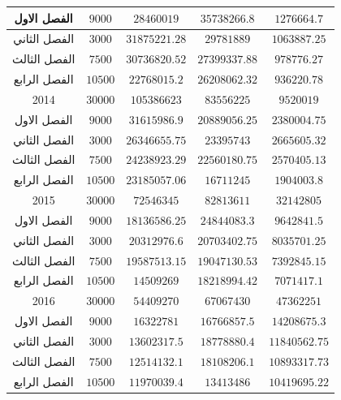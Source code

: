 \documentclass[10pt,a4paper]{report}
\begin{document}
\begin{longtable}{|c|c|c|c|c|}
	الفصل الاول  & $9000$               & $28460019$       & $35738266.8$   & $1276664.7$        \\ \hline
	الفصل الثاني & $3000$               & $31875221.28$    & $29781889$     & $1063887.25$       \\ \hline
	الفصل الثالث & $7500$               & $30736820.52$    & $27399337.88$  & $978776.27$        \\ \hline
	الفصل الرابع & $10500$              & $22768015.2$     & $26208062.32$  & $936220.78$        \\ \hline
	2014         & $30000$              & $105386623$      & $83556225$     & $9520019$          \\ \hline
	الفصل الاول  & $9000$               & $31615986.9$     & $20889056.25$  & $2380004.75$       \\ \hline
	الفصل الثاني & $3000$               & $26346655.75$    & $23395743$     & $2665605.32$       \\ \hline
	الفصل الثالث & $7500$               & $24238923.29$    & $22560180.75$  & $2570405.13$       \\ \hline
	الفصل الرابع & $10500$              & $23185057.06$    & $16711245$     & $1904003.8$        \\ \hline
	2015         & $30000$              & $72546345$       & $82813611$     & $32142805$         \\ \hline
	الفصل الاول  & $9000$               & $18136586.25$    & $24844083.3$   & $9642841.5$        \\ \hline
	الفصل الثاني & $3000$               & $20312976.6$     & $20703402.75$  & $8035701.25$       \\ \hline
	الفصل الثالث & $7500$               & $19587513.15$    & $19047130.53$  & $7392845.15$       \\ \hline
	الفصل الرابع & $10500$              & $14509269$       & $18218994.42$  & $7071417.1$        \\ \hline
	2016         & $30000$              & $54409270$       & $67067430$     & $47362251$         \\ \hline
	الفصل الاول  & $9000$               & $16322781$       & $16766857.5$   & $14208675.3$       \\ \hline
	الفصل الثاني & $3000$               & $13602317.5$     & $18778880.4$   & $11840562.75$      \\ \hline
	الفصل الثالث & $7500$               & $12514132.1$     & $18108206.1$   & $10893317.73$      \\ \hline
	الفصل الرابع & $10500$              & $11970039.4$     & $13413486$     & $10419695.22$      \\ \hline

\end{longtable}
\end{document}
